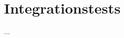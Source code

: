 \documentclass[../implementierung.tex]{subfiles}
\begin{document}
\section{Integrationstests}
...
\end{document}
